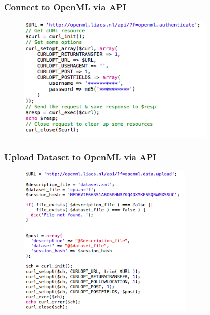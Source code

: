 \documentclass[compress]{beamer}
\begin{document}
\begin{frame}
\frametitle{Connect to OpenML via API} 

\begin{figure}[h!]
  \centering
    \includegraphics[width=0.85\textwidth]{openml-connect}
\end{figure}

\end{frame}

\begin{frame}
\frametitle{Upload Dataset to OpenML via API} 

\begin{figure}[h!]
  \centering
    \includegraphics[width=0.75\textwidth]{openml-ds}
\end{figure}

\end{frame}
\end{document}
